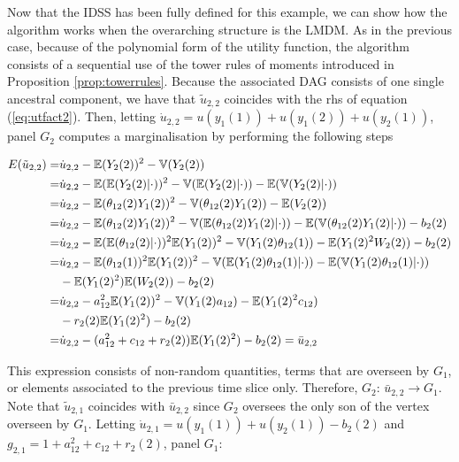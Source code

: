 Now that the IDSS has been fully defined for this example, we can show how the algorithm works  when the overarching structure is the LMDM. As in the previous case, because of the polynomial form of the utility function, the algorithm consists of a sequential use of the tower rules of moments introduced in Proposition \ref{prop:towerrules}. Because the associated DAG consists of one single ancestral component, we have that $\tilde{u}_{2,2}$ coincides with the rhs of equation (\ref{eq:utfact2}). Then, letting $\dot{u}_{2,2}=u(y_1(1))+u(y_1(2))+u(y_2(1))$, panel $G_2$ computes a marginalisation by performing the following steps

\begin{align}
 E(\tilde{u}_{2,2})=&\dot{u}_{2,2}-\mathbb{E}(Y_2(2))^2-\mathbb{V}(Y_2(2))\nonumber\\
 =&\dot{u}_{2,2}-\mathbb{E}(\mathbb{E}(Y_2(2)|\cdot))^2-\mathbb{V}(\mathbb{E}(Y_2(2)|\cdot))-\mathbb{E}(\mathbb{V}(Y_2(2)|\cdot))\nonumber\\
 =&\dot{u}_{2,2}-\mathbb{E}(\theta_{12}(2)Y_1(2))^2-\mathbb{V}(\theta_{12}(2)Y_1(2))-\mathbb{E}(V_2(2))\nonumber\\
 =&\dot{u}_{2,2}- \mathbb{E}(\theta_{12}(2)Y_1(2))^2-\mathbb{V}(\mathbb{E}(\theta_{12}(2)Y_1(2)|\cdot))-\mathbb{E}(\mathbb{V}(\theta_{12}(2)Y_1(2)|\cdot))-b_2(2)\nonumber\\
 =&\dot{u}_{2,2}-\mathbb{E}(\mathbb{E}(\theta_{12}(2)|\cdot))^2\mathbb{E}(Y_1(2))^2-\mathbb{V}(Y_1(2)\theta_{12}(1))-\mathbb{E}(Y_1(2)^2W_2(2))-b_2(2)\nonumber\\
 =&\dot{u}_{2,2}-\mathbb{E}(\theta_{12}(1))^2\mathbb{E}(Y_1(2))^2-\mathbb{V}(\mathbb{E}(Y_1(2)\theta_{12}(1)|\cdot))-\mathbb{E}(\mathbb{V}(Y_1(2)\theta_{12}(1)|\cdot))\nonumber\\
 & -\mathbb{E}(Y_1(2)^2)\mathbb{E}(W_2(2))-b_2(2)\nonumber\\
 =&\dot{u}_{2,2}-a_{12}^2\mathbb{E}(Y_1(2))^2-\mathbb{V}(Y_1(2)a_{12})-\mathbb{E}(Y_1(2)^2c_{12})\nonumber\\
 &-r_{2}(2)\mathbb{E}(Y_1(2)^2)-b_2(2)\nonumber\\
 =&\dot{u}_{2,2}-(a_{12}^2+c_{12}+r_2(2))\mathbb{E}(Y_1(2)^2)-b_{2}(2)=\bar{u}_{2,2}\nonumber
 \end{align}

This expression consists  of non-random quantities, terms that are overseen by $G_1$, or elements associated to the previous time slice only. Therefore, $G_2$: $ \bar{u}_{2,2} \longrightarrow G_1$.  Note that $\tilde{u}_{2,1}$ coincides with $\bar{u}_{2,2}$ since $G_2$ oversees the only son of the vertex overseen by $G_1$. Letting $\dot{u}_{2,1}=u(y_1(1))+u(y_2(1))-b_{2}(2)$ and $g_{2,1}=1+a_{12}^2+c_{12}+r_2(2)$, panel $G_1$: 

